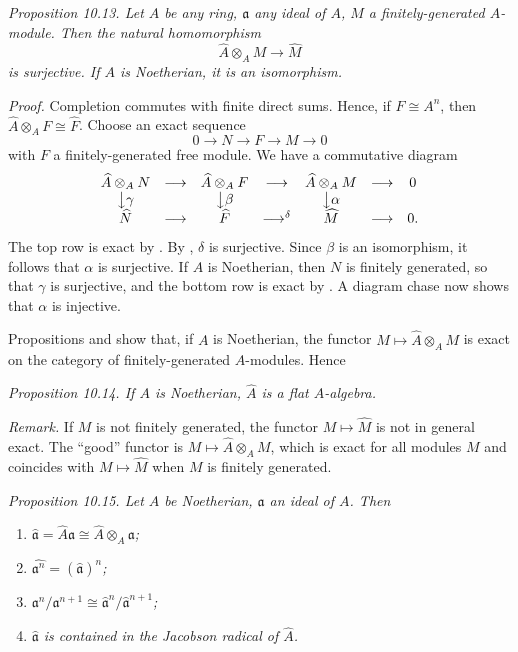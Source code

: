 \noindent\textit{Proposition 10.13. Let $A$ be any ring, $\mathfrak a$ any ideal of $A$, $M$ a finitely-generated $A$-module. Then the natural homomorphism}
\[
\widehat A\otimes_AM\longrightarrow\widehat M
\]
\textit{is surjective. If $A$ is Noetherian, it is an isomorphism.}

\noindent\textit{Proof.} Completion commutes with finite direct sums. Hence, if $F\cong A^n$, then $\widehat A\otimes_AF\cong\widehat F$. Choose an exact sequence
\[
0\longrightarrow N\longrightarrow F\longrightarrow M\longrightarrow0
\]
with $F$ a finitely-generated free module. We have a commutative diagram
\[
\begin{array}{ccccccccc}
\widehat A\otimes_AN&\longrightarrow&\widehat A\otimes_AF&\longrightarrow&\widehat A\otimes_AM&\longrightarrow&0\\
\big\downarrow\gamma&&\big\downarrow\beta&&\big\downarrow\alpha&&\\
\widehat N&\longrightarrow&\widehat F&\mathop{\longrightarrow}^{\delta}&\widehat M&\longrightarrow&0.
\end{array}
\]
The top row is exact by . By , $\delta$ is surjective. Since $\beta$ is an isomorphism, it follows that $\alpha$ is surjective. If $A$ is Noetherian, then $N$ is finitely generated, so that $\gamma$ is surjective, and the bottom row is exact by . A diagram chase now shows that $\alpha$ is injective. \proofbox

Propositions  and  show that, if $A$ is Noetherian, the functor $M\mapsto\widehat A\otimes_AM$ is exact on the category of finitely-generated $A$-modules. Hence

\noindent\textit{Proposition 10.14. If $A$ is Noetherian, $\widehat A$ is a flat $A$-algebra.} \proofbox

\noindent\textit{Remark.} If $M$ is not finitely generated, the functor $M\mapsto\widehat M$ is not in general exact. The ``good'' functor is $M\mapsto\widehat A\otimes_AM$, which is exact for all modules $M$ and coincides with $M\mapsto\widehat M$ when $M$ is finitely generated.

\noindent\textit{Proposition 10.15. Let $A$ be Noetherian, $\mathfrak a$ an ideal of $A$. Then}
\begin{enumerate}
\renewcommand{\labelenumi}{\roman{enumi})}
\item \textit{$\widehat{\mathfrak a}=\widehat A\mathfrak a\cong\widehat A\otimes_A\mathfrak a$;}
\item \textit{$\widehat{\mathfrak a^n}=(\widehat{\mathfrak a})^n$;}
\item \textit{$\mathfrak a^n/\mathfrak a^{n+1}\cong\widehat{\mathfrak a}^{n}/\widehat{\mathfrak a}^{n+1}$;}
\item \textit{$\widehat{\mathfrak a}$ is contained in the Jacobson radical of $\widehat A$.}
\end{enumerate}

